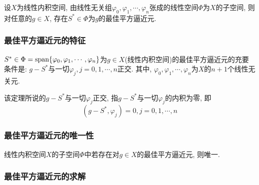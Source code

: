 \begin{theorem}%
    设$X$为线性内积空间, 由线性无关组$\varphi_0,\varphi_1,\cdots,\varphi_n$张成的线性空间$\Phi$为$X$的子空间, 则对任意的$g\in X$, 存在$S^*\in \Phi$为$g$的最佳平方逼近元.
\end{theorem}

\subsubsection{最佳平方逼近元的特征}

\begin{theorem} %
    $S^*\in\Phi=\text{span}\{\varphi_0,\varphi_1,\cdots,\varphi_n\}$为$g\in X$(线性内积空间)的最佳平方逼近元的充要条件是: $g-S^*$与一切${\varphi_j},j=0,1,\cdots,n$正交. 其中, $\varphi_0,\varphi_1,\cdots,\varphi_n$为$X$的$n+1$个线性无关元.
\end{theorem}

该定理所说的$g-S^*$与一切$\varphi_j$正交, 指$g-S^*$与一切$\varphi_j$的内积为零, 即
\begin{equation*}
    (g-S^*,\varphi_j)=0, j=0,1,\cdots,n
\end{equation*}

\subsubsection{最佳平方逼近元的唯一性}

\begin{theorem}
    线性内积空间$X$的子空间$\Phi$中若存在对$g\in X$的最佳平方逼近元, 则唯一.
\end{theorem}

\subsubsection{最佳平方逼近元的求解}


